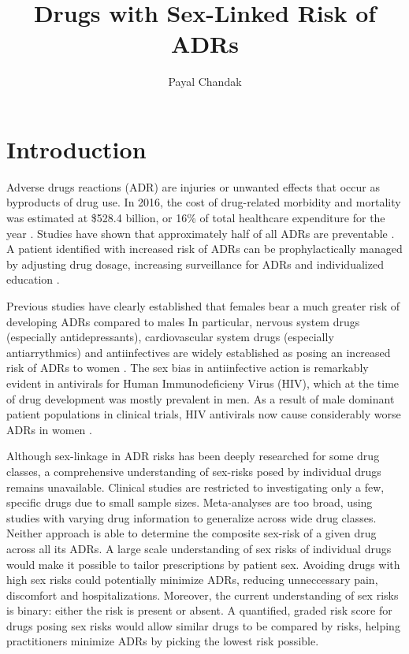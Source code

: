 \documentclass[11pt, oneside]{article}
\title{Drugs with Sex-Linked Risk of ADRs}
\author{Payal Chandak}
\date{}
\begin{document}
\maketitle

\newpage

\section{Introduction}

Adverse drugs reactions (ADR) are injuries or unwanted effects that occur as byproducts of drug use. In 2016, the cost of drug-related morbidity and mortality was estimated at \$528.4 billion, or 16\% of total healthcare expenditure for the year \cite{watanabe_cost_2018}. Studies have shown that approximately half of all ADRs are preventable \cite{hakkarainen_percentage_2012}. A patient identified with increased risk of ADRs can be prophylactically managed by adjusting drug dosage, increasing surveillance for ADRs and individualized education \cite{tharpe_adverse_2011}. 

Previous studies have clearly established that females bear a much greater risk of developing ADRs compared to males \cite{rademaker_women_2001,anderson_sex_2005,whitley_sex-based_2009,ofotokun_sex_2003,bigos_sex_2009,rodenburg_sex_2012,yu_systematic_2016,tharpe_adverse_2011,tran_gender_1998,drici_is_2001,stabile_gender_2014,colombo_gender_2016,makkar_female_1993} In particular, nervous system drugs (especially antidepressants), cardiovascular system drugs (especially antiarrythmics) and antiinfectives are widely established as posing an increased risk of ADRs to women \cite{tran_gender_1998,drici_is_2001, rodenburg_sex_2012, tharpe_adverse_2011, ofotokun_sex_2003,whitley_sex-based_2009}. The sex bias in antiinfective action is remarkably evident in antivirals for Human Immunodeficieny Virus (HIV), which at the time of drug development was mostly prevalent in men. As a result of male dominant patient populations in clinical trials, HIV antivirals now cause considerably worse ADRs in women \cite{ofotokun_sex_2003,whitley_sex-based_2009}.

Although sex-linkage in ADR risks has been deeply researched for some drug classes, a comprehensive understanding of sex-risks posed by individual drugs remains unavailable. Clinical studies are restricted to investigating only a few, specific drugs due to small sample sizes. Meta-analyses are too broad, using studies with varying drug information to generalize across wide drug classes. Neither approach is able to determine the composite sex-risk of a given drug across all its ADRs. A large scale understanding of sex risks of individual drugs would make it possible to tailor prescriptions by patient sex. Avoiding drugs with high sex risks could potentially minimize ADRs, reducing unneccessary pain, discomfort and hospitalizations. Moreover, the current understanding of sex risks is binary: either the risk is present or absent. A quantified, graded risk score for drugs posing sex risks would allow similar drugs to be compared by risks, helping practitioners minimize ADRs by picking the lowest risk possible. 
\end{document}

